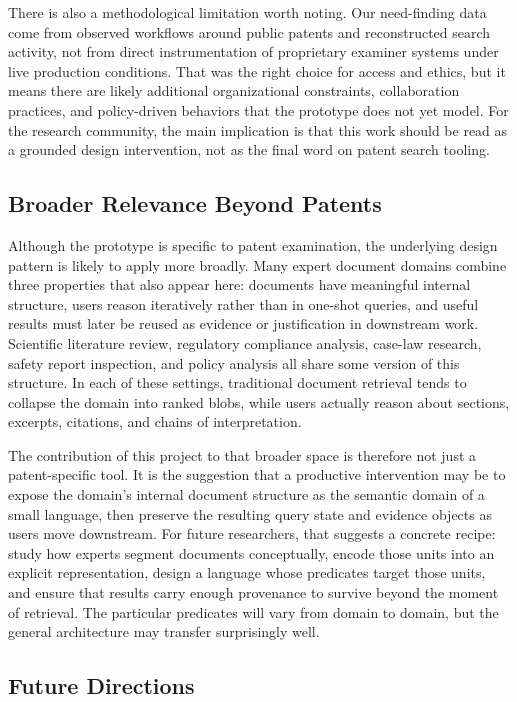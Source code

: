 \documentclass[sigconf]{acmart}
\begin{document}
There is also a methodological limitation worth noting. Our need-finding data
come from observed workflows around public patents and reconstructed search
activity, not from direct instrumentation of proprietary examiner systems under
live production conditions. That was the right choice for access and ethics, but
it means there are likely additional organizational constraints, collaboration
practices, and policy-driven behaviors that the prototype does not yet model.
For the research community, the main implication is that this work should be
read as a grounded design intervention, not as the final word on patent search
tooling.

\subsection{Broader Relevance Beyond Patents}

Although the prototype is specific to patent examination, the underlying design
pattern is likely to apply more broadly. Many expert document domains combine
three properties that also appear here: documents have meaningful internal
structure, users reason iteratively rather than in one-shot queries, and useful
results must later be reused as evidence or justification in downstream work.
Scientific literature review, regulatory compliance analysis, case-law research,
safety report inspection, and policy analysis all share some version of this
structure. In each of these settings, traditional document retrieval tends to
collapse the domain into ranked blobs, while users actually reason about
sections, excerpts, citations, and chains of interpretation.

The contribution of this project to that broader space is therefore not just a
patent-specific tool. It is the suggestion that a productive intervention may be
to expose the domain's internal document structure as the semantic domain of a
small language, then preserve the resulting query state and evidence objects as
users move downstream. For future researchers, that suggests a concrete recipe:
study how experts segment documents conceptually, encode those units into an
explicit representation, design a language whose predicates target those units,
and ensure that results carry enough provenance to survive beyond the moment of
retrieval. The particular predicates will vary from domain to domain, but the
general architecture may transfer surprisingly well.

\subsection{Future Directions}
\end{document}
